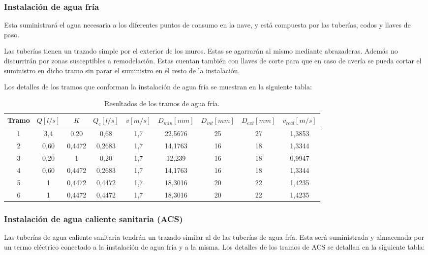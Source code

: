 \documentclass[../main.tex]{subfiles}
\begin{document}
\subsubsection{Instalación de agua fría}
Esta suministrará el agua necesaria a los diferentes puntos de consumo en la nave, y está compuesta por las tuberías, codos y llaves de paso. \par
\vspace{0.5 cm}
Las tuberías tienen un trazado simple por el exterior de los muros. Estas se agarrarán al mismo mediante abrazaderas. Además no discurrirán por zonas susceptibles a remodelación. Estas cuentan también con llaves de corte para que en caso de avería se pueda cortar el suministro en dicho tramo sin parar el suministro en el resto de la instalación. \par
\vspace{0.5 cm}
Los detalles de los tramos que conforman la instalación de agua fría se muestran en la siguiente tabla:
\begin{table}[H]
    \centering
    \begin{tabular}{c | c | c | c | c | c | c | c | c}
         Tramo & $Q [l/s]$ & $K$ & $Q_c [l/s]$ & $v [m/s]$ & $D_{min} [mm]$ & $D_{int} [mm]$ & $D_{ext} [mm]$ & $v_{real} [m/s]$ \\ \hline
         1 & 3,4 & 0,20 & 0,68 & 1,7 & 22,5676 & 25 & 27 & 1,3853 \\
         2 & 0,60 & 0,4472 & 0,2683 & 1,7 & 14,1763 & 16 & 18 & 1,3344\\
         3 & 0,20 & 1 & 0,20 & 1,7 & 12,239 & 16 & 18 & 0,9947\\
         4 & 0,60 & 0,4472 & 0,2683 & 1,7 & 14,1763 & 16 & 18 & 1,3344 \\
         5 & 1 & 0,4472 & 0,4472 & 1,7 & 18,3016 & 20 & 22 & 1,4235 \\
         6 & 1 & 0,4472 & 0,4472 & 1,7 & 18,3016 & 20 & 22 & 1,4235\\
    \end{tabular}
    \caption{Resultados de los tramos de agua fría.}
\end{table}

\subsubsection{Instalación de agua caliente sanitaria (ACS)}
Las tuberías de agua caliente sanitaria tendrán un trazado similar al de las tuberías de agua fría. Esta será suministrada y almacenada por un termo eléctrico conectado a la instalación de agua fría y a la misma. Los detalles de los tramos de ACS se detallan en la siguiente tabla:
\end{document}
